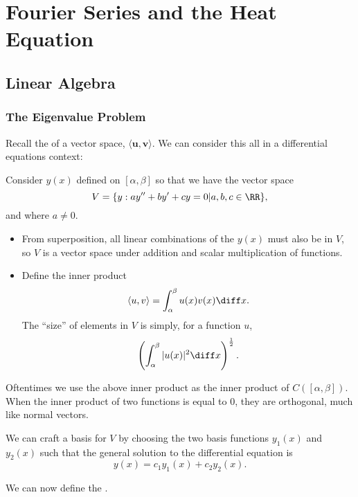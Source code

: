 \chapter{Fourier Series and the Heat Equation}

\section{Linear Algebra}

\subsection{The Eigenvalue Problem}
Recall the  of a vector space, $\langle \mathbf{u}, \mathbf{v}\rangle$. We can consider this all in a differential equations context: 

Consider $y(x)$ defined on $[\alpha,\beta]$ so that we have the vector space 
\[ V = \{y: ay'' + by' + cy = 0 | a,b,c \in \RR \}, \] and where $a \neq 0$. 
\begin{itemize}
\item From superposition, all linear combinations of the $y(x)$ must also be in $V$, so $V$ is a vector space under addition and scalar multiplication of functions. 
\item Define the inner product 
\[ \langle u,v \rangle = \int_\alpha^\beta u(x)v(x) \diff x. \] The ``size'' of elements in $V$ is simply, for a function $u$, 
\[ \left( \int_\alpha^\beta |u(x)|^2 \diff x  \right)^{\frac{1}{2}}. \] 
\end{itemize}

Oftentimes we use the above inner product as the inner product of $C([\alpha,\beta])$. When the inner product of two functions is equal to 0, they are orthogonal, much like normal vectors. 

We can craft a basis for $V$ by choosing the two basis functions $y_1(x)$ and $y_2(x)$ such that the general solution to the differential equation is 
\[ y(x) = c_1y_1(x) + c_2y_2(x). \] 


We can now define the . 

